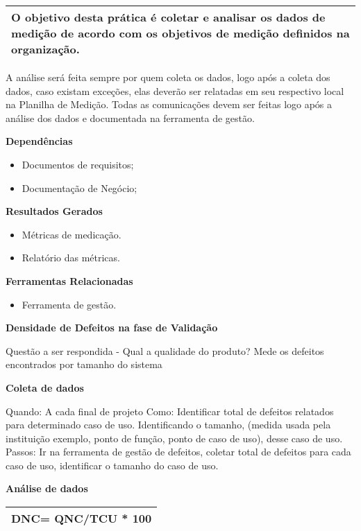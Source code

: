 \begin{table}[!ht]
\centering
\begin{tabular}{|p{130mm}|}
\hline
O objetivo desta prática é coletar e analisar os dados de medição de acordo com os objetivos de medição definidos na organização. \\ 
\hline
\end{tabular}
\end{table}

A análise será feita sempre por quem coleta os dados, logo após a coleta dos dados, caso existam exceções, elas deverão ser relatadas em seu respectivo local na Planilha de Medição. Todas as comunicações devem ser feitas logo após a análise dos dados e documentada na ferramenta de gestão.

\textbf{Dependências}
\begin{itemize}
    \item Documentos de requisitos;
    \item Documentação de Negócio;
\end{itemize}

\textbf{Resultados Gerados}
\begin{itemize}
    \item Métricas de medicação.
    \item Relatório das métricas.
\end{itemize}

\textbf{Ferramentas Relacionadas}
\begin{itemize}
    \item Ferramenta de gestão.
\end{itemize}

\textbf{Densidade de Defeitos na fase de Validação}

Questão a ser respondida - Qual a qualidade do produto? Mede os defeitos encontrados por tamanho do sistema

\textbf{Coleta de dados}

Quando: A cada final de projeto Como: Identificar total de defeitos relatados para determinado caso de uso. Identificando o tamanho, (medida usada pela instituição exemplo, ponto de função, ponto de caso de uso), desse caso de uso. Passos: Ir na ferramenta de gestão de defeitos, coletar total de defeitos para cada caso de uso, identificar o tamanho do caso de uso.

\textbf{Análise de dados}

\begin{tabular}{|l|}
\hline
DNC= QNC/TCU * 100 \\ 
\hline
\end{tabular}


